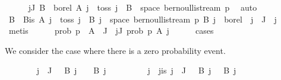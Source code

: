 \begin{isabellebody}
\ \ \ \ \isamarkupfalse%
\ {\isachardoublequoteopen}{\isasymforall}j{\isasymin}J{\isachardot}{\kern0pt}\ {\isasymexists}B\ {\isasymin}\ borel{\isachardot}{\kern0pt}\ A\ j\ {\isacharequal}{\kern0pt}\ toss\ j\ {\isacharminus}{\kern0pt}{\isacharbackquote}{\kern0pt}\ B\ {\isasyminter}\ space\ {\isacharparenleft}{\kern0pt}bernoulli{\isacharunderscore}{\kern0pt}stream\ p{\isacharparenright}{\kern0pt}{\isachardoublequoteclose}\ \isamarkupfalse%
\ auto\isanewline
\ \ \ \ \isamarkupfalse%
\ \isamarkupfalse%
\ B\ \ B{\isacharunderscore}{\kern0pt}is{\isacharcolon}{\kern0pt}\ {\isachardoublequoteopen}A\ j\ {\isacharequal}{\kern0pt}\ toss\ j\ {\isacharminus}{\kern0pt}{\isacharbackquote}{\kern0pt}\ B\ j\ {\isasyminter}\ space\ {\isacharparenleft}{\kern0pt}bernoulli{\isacharunderscore}{\kern0pt}stream\ p{\isacharparenright}{\kern0pt}{\isachardoublequoteclose}\ {\isachardoublequoteopen}B\ j\ {\isasymin}\ borel{\isachardoublequoteclose}\ \ {\isachardoublequoteopen}j\ {\isasymin}\ J{\isachardoublequoteclose}\ \ j\ \isamarkupfalse%
\ metis\isanewline
\isanewline
\ \ \ \ \isamarkupfalse%
\ {\isachardoublequoteopen}prob\ p\ {\isacharparenleft}{\kern0pt}{\isasymInter}\ {\isacharparenleft}{\kern0pt}A\ {\isacharbackquote}{\kern0pt}\ J{\isacharparenright}{\kern0pt}{\isacharparenright}{\kern0pt}\ {\isacharequal}{\kern0pt}\ {\isacharparenleft}{\kern0pt}{\isasymProd}j{\isasymin}J{\isachardot}{\kern0pt}\ prob\ p\ {\isacharparenleft}{\kern0pt}A\ j{\isacharparenright}{\kern0pt}{\isacharparenright}{\kern0pt}{\isachardoublequoteclose}\isanewline
\ \ \ \ \isamarkupfalse%
\ cases%
\begin{isamarkuptext}%
We consider the case where there is a zero probability event.%
\end{isamarkuptext}\isamarkuptrue%
\ \ \ \ \ \ \isamarkupfalse%
\ {\isachardoublequoteopen}{\isasymexists}j\ {\isasymin}\ J{\isachardot}{\kern0pt}\ {}\ {\isasymnotin}\ B\ j\ {\isasymand}\ {\isacharminus}{\kern0pt}{}\ {\isasymnotin}\ B\ j{\isachardoublequoteclose}\isanewline
\ \ \ \ \ \ \isamarkupfalse%
\ \isamarkupfalse%
\ j\ \ j{\isacharunderscore}{\kern0pt}is{\isacharcolon}{\kern0pt}\ {\isachardoublequoteopen}j\ {\isasymin}\ J{\isachardoublequoteclose}\ {\isachardoublequoteopen}{}\ {\isasymnotin}\ B\ j{\isachardoublequoteclose}\ {\isachardoublequoteopen}{\isacharminus}{\kern0pt}{}\ {\isasymnotin}\ B\ j{\isachardoublequoteclose}\ \isamarkupfalse%

\end{isabellebody}
